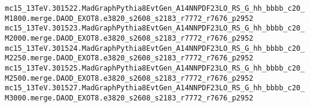 {\verb|mc15_13TeV.301522.MadGraphPythia8EvtGen_A14NNPDF23LO_RS_G_hh_bbbb_c20_M1800.merge.DAOD_EXOT8.e3820_s2608_s2183_r7772_r7676_p2952|\\
\verb|mc15_13TeV.301523.MadGraphPythia8EvtGen_A14NNPDF23LO_RS_G_hh_bbbb_c20_M2000.merge.DAOD_EXOT8.e3820_s2608_s2183_r7772_r7676_p2952|\\
\verb|mc15_13TeV.301524.MadGraphPythia8EvtGen_A14NNPDF23LO_RS_G_hh_bbbb_c20_M2250.merge.DAOD_EXOT8.e3820_s2608_s2183_r7772_r7676_p2952|\\
\verb|mc15_13TeV.301525.MadGraphPythia8EvtGen_A14NNPDF23LO_RS_G_hh_bbbb_c20_M2500.merge.DAOD_EXOT8.e3820_s2608_s2183_r7772_r7676_p2952|\\
\verb|mc15_13TeV.301527.MadGraphPythia8EvtGen_A14NNPDF23LO_RS_G_hh_bbbb_c20_M3000.merge.DAOD_EXOT8.e3820_s2608_s2183_r7772_r7676_p2952|
}
\noindent

\vspace{1cm}

